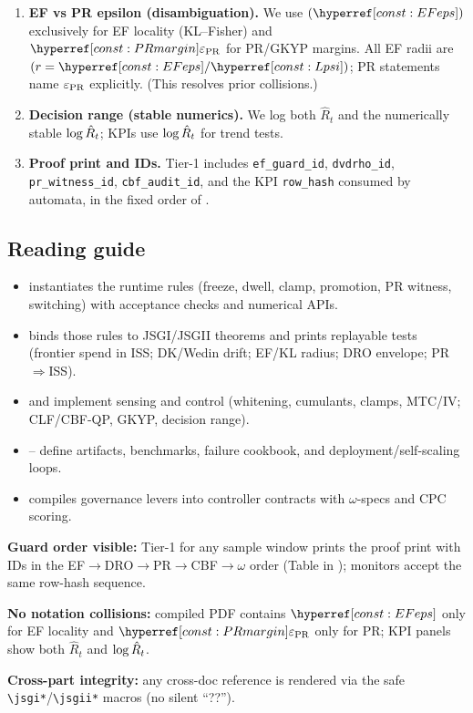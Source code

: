 \begin{enumerate}[leftmargin=*]
\item \textbf{EF vs PR epsilon (disambiguation).} We use $(\constref{EFeps})$ exclusively for EF locality (KL–Fisher) and $\constref{PRmargin}$ for PR/GKYP margins. All EF radii are $(r=\constref{EFeps}/\constref{Lpsi})$; PR statements name $\varepsilon_{\mathrm{PR}}$ explicitly. (This resolves prior collisions.)
\item \textbf{Decision range (stable numerics).} We log both $\hat R_t$ and the numerically stable $\log \hat R_t$; KPIs use $\log \hat R_t$ for trend tests. 
\item \textbf{Proof print and IDs.} Tier-1 includes \texttt{ef\_guard\_id}, \texttt{dvdrho\_id}, \texttt{pr\_witness\_id}, \texttt{cbf\_audit\_id}, and the KPI \texttt{row\_hash} consumed by automata, in the fixed order of .
\end{enumerate}

\subsection{Reading guide}\label{subsec:intro-roadmap}
\emph{}

\begin{itemize}[leftmargin=*]
\item {} instantiates the runtime rules (freeze, dwell, clamp, promotion, PR witness, switching) with acceptance checks and numerical APIs.
\item {} binds those rules to JSGI/JSGII theorems and prints replayable tests (frontier spend in ISS; DK/Wedin drift; EF/KL radius; DRO envelope; PR$\Rightarrow$ISS).
\item {} and  implement sensing and control (whitening, cumulants, clamps, MTC/IV; CLF/CBF-QP, GKYP, decision range).
\item {}– define artifacts, benchmarks, failure cookbook, and deployment/self-scaling loops.
\item {} compiles governance levers into controller contracts with $\omega$-specs and CPC scoring.
\end{itemize}

\begin{acceptchecks}
\item \textbf{Guard order visible:} Tier-1 for any sample window prints the proof print with IDs in the EF$\rightarrow$DRO$\rightarrow$PR$\rightarrow$CBF$\rightarrow\omega$ order (Table in ); monitors accept the same row-hash sequence.
\item \textbf{No notation collisions:} compiled PDF contains $\constref{EFeps}$ only for EF locality and $\constref{PRmargin}$ only for PR; KPI panels show both $\hat R_t$ and $\log \hat R_t$.
\item \textbf{Cross-part integrity:} any cross-doc reference is rendered via the safe \texttt{\textbackslash jsgi*}/\texttt{\textbackslash jsgii*} macros (no silent “??”). 
\end{acceptchecks}

